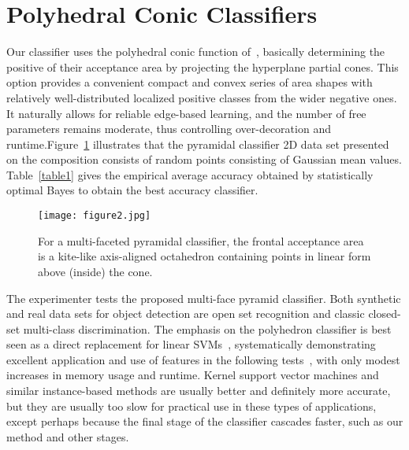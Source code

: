 \documentclass[10pt,twocolumn,letterpaper]{article}
\begin{document}
\section{Polyhedral Conic Classifiers}
Our classifier uses the polyhedral conic function of~\cite{Gasimov_2006_Separation}, basically determining the positive of their acceptance area by projecting the hyperplane partial cones. This option provides a convenient compact and convex series of area shapes with relatively well-distributed localized positive classes from the wider negative ones. It naturally allows for reliable edge-based learning, and the number of free parameters remains moderate, thus controlling over-decoration and runtime.Figure~\ref{pic2} illustrates that the pyramidal classifier 2D data set presented on the composition consists of random points consisting of Gaussian mean values. Table~\ref{table1} gives the empirical average accuracy obtained by statistically optimal Bayes to obtain the best accuracy classifier.
\begin{figure}[htp]
	\centering
	\texttt{[image: figure2.jpg]}
	\caption{ For a multi-faceted pyramidal classifier, the frontal acceptance area is a kite-like axis-aligned octahedron containing points in linear form above (inside) the cone.
	}\label{pic2}
\end{figure}
\par 
The experimenter tests the proposed multi-face pyramid classifier. Both synthetic and real data sets for object detection are open set recognition and classic closed-set multi-class discrimination. The emphasis on the polyhedron classifier is best seen as a direct replacement for linear SVMs~\cite{Vedaldi_2012_Efficient}\cite{Mangasarian_2006_Multisurface}, systematically demonstrating excellent application and use of features in the following tests~\cite{Dundar_2008_Polyhedral}, with only modest increases in memory usage and runtime. Kernel support vector machines and similar instance-based methods are usually better and definitely more accurate, but they are usually too slow for practical use in these types of applications, except perhaps because the final stage of the classifier cascades faster, such as our method and other stages.
\end{document}
